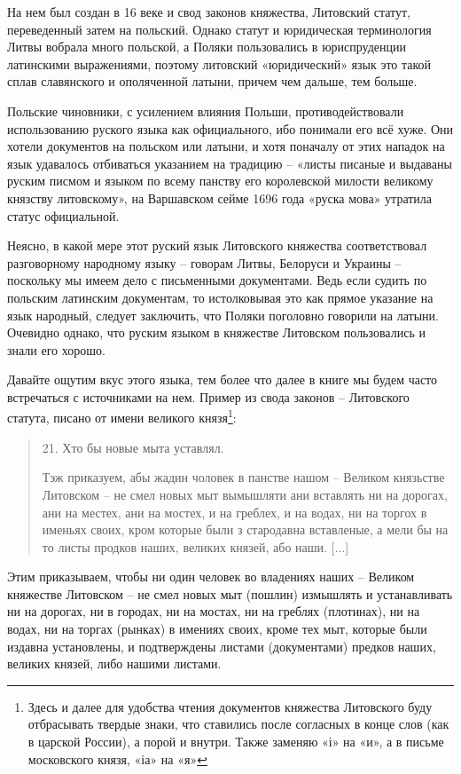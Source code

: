 На нем был создан в 16 веке и свод законов княжества, Литовский статут, переведенный затем на польский. Однако статут и юридическая терминология Литвы вобрала много польской, а Поляки пользовались в юриспруденции латинскими выражениями, поэтому литовский «юридический» язык это такой сплав славянского и ополяченной латыни, причем чем дальше, тем больше.

Польские чиновники, с усилением влияния Польши, противодействовали использованию руского языка как официального, ибо понимали его всё хуже. Они хотели документов на польском или латыни, и хотя поначалу от этих нападок на язык удавалось отбиваться указанием на традицию – «листы писаные и выдаваны руским писмом и языком по всему панству его королевской милости великому князству литовскому», на Варшавском сейме 1696 года «руска мова» утратила статус официальной.

Неясно, в какой мере этот руский язык Литовского княжества соответствовал разговорному народному языку – говорам Литвы, Белоруси и Украины – поскольку мы имеем дело с письменными документами. Ведь если судить по польским латинским документам, то истолковывая это как прямое указание на язык народный, следует заключить, что Поляки поголовно говорили на латыни. Очевидно однако, что руским языком в княжестве Литовском пользовались и знали его хорошо.

Давайте ощутим вкус этого языка, тем более что далее в книге мы будем часто встречаться с источниками на нем. Пример из свода законов – Литовского статута, писано от имени великого князя\footnote{Здесь и далее для удобства чтения документов княжества Литовского буду отбрасывать твердые знаки, что ставились после согласных в конце слов (как в царской России), а порой и внутри. Также заменяю «і» на «и», а в письме московского князя, «іа» на «я»}:

\begin{quotation}
21. Хто бы новые мыта уставлял.

Тэж приказуем, абы жадин чоловек в панстве нашом – Великом князьстве Литовском – не смел новых мыт вымышляти ани вставлять ни на дорогах, ани на местех, ани на мостех, и на греблех, и на водах, ни на торгох в именьях своих, кром которые были з стародавна вставленые, а мели бы на то листы продков наших, великих князей, або наши. [...]
\end{quotation}

Этим приказываем, чтобы ни один человек во владениях наших – Великом княжестве Литовском – не смел новых мыт (пошлин) измышлять и устанавливать ни на дорогах, ни в городах, ни на мостах, ни на греблях (плотинах), ни на водах, ни на торгах (рынках) в имениях своих, кроме тех мыт, которые были издавна установлены, и подтверждены листами (документами) предков наших, великих князей, либо нашими листами.

